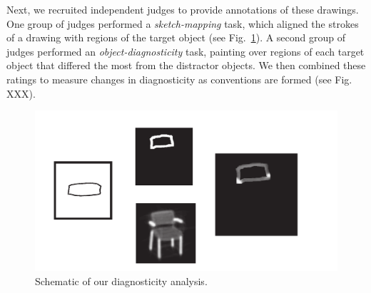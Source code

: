 \documentclass[11pt,letterpaper]{article}
\begin{document}
Next, we recruited independent judges to provide annotations of these drawings. 
One group of judges performed a \emph{sketch-mapping} task, which aligned the strokes of a drawing with regions of the target object (see Fig.~\ref{fig:diagnosticity_schema}).
A second group of judges performed an \emph{object-diagnosticity} task, painting over regions of each target object that differed the most from the distractor objects.
We then combined these ratings to measure changes in diagnosticity as conventions are formed (see Fig. XXX).


\begin{figure}[b!]
\includegraphics[width=\linewidth]{figures/diagnosticity.pdf}
\centering
\caption{Schematic of our diagnosticity analysis.}
\label{fig:diagnosticity_schema}
\end{figure}



\end{document}
